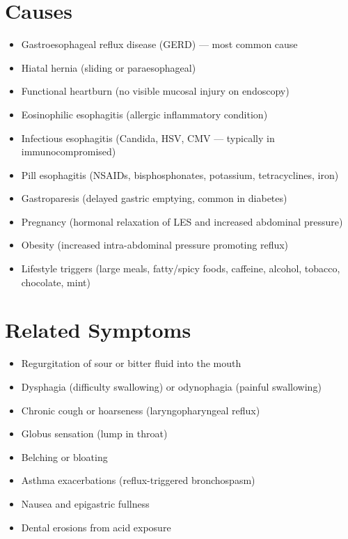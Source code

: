 \section*{Causes}
\begin{itemize}
  \item Gastroesophageal reflux disease (GERD) — most common cause
  \item Hiatal hernia (sliding or paraesophageal)
  \item Functional heartburn (no visible mucosal injury on endoscopy)
  \item Eosinophilic esophagitis (allergic inflammatory condition)
  \item Infectious esophagitis (Candida, HSV, CMV — typically in immunocompromised)
  \item Pill esophagitis (NSAIDs, bisphosphonates, potassium, tetracyclines, iron)
  \item Gastroparesis (delayed gastric emptying, common in diabetes)
  \item Pregnancy (hormonal relaxation of LES and increased abdominal pressure)
  \item Obesity (increased intra-abdominal pressure promoting reflux)
  \item Lifestyle triggers (large meals, fatty/spicy foods, caffeine, alcohol, tobacco, chocolate, mint)
\end{itemize}

\section*{Related Symptoms}
\begin{itemize}
  \item Regurgitation of sour or bitter fluid into the mouth
  \item Dysphagia (difficulty swallowing) or odynophagia (painful swallowing)
  \item Chronic cough or hoarseness (laryngopharyngeal reflux)
  \item Globus sensation (lump in throat)
  \item Belching or bloating
  \item Asthma exacerbations (reflux-triggered bronchospasm)
  \item Nausea and epigastric fullness
  \item Dental erosions from acid exposure
\end{itemize}

